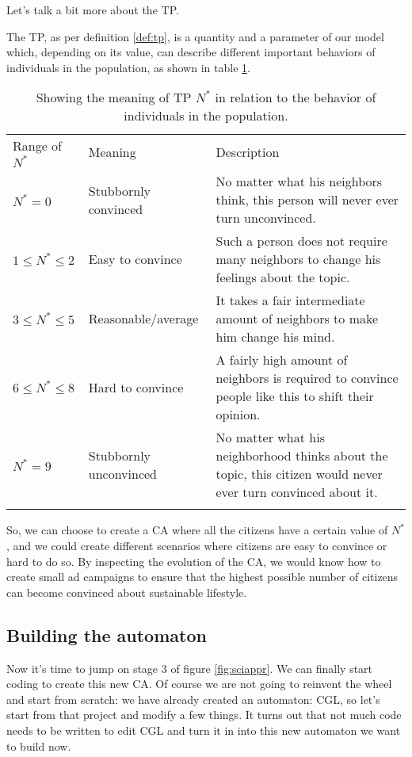 Let's talk a bit more about the TP.

\begin{proposition}
The TP, as per definition \ref{def:tp}, is a quantity and a parameter of our model which,
depending on its value, can describe different important behaviors of individuals in the population,
as shown in table \ref{tab:meaningn}.
\end{proposition}

%
%
\begin{table}[!t]
\centering
\caption{Showing the meaning of TP $N^\ast$ in relation to the behavior of individuals
in the population.}
\label{tab:meaningn}
%
%
\begin{tabular}{p{}p{}p{}}
\hline\noalign{\smallskip}
Range of $N^\ast$ & Meaning & Description \\
\noalign{\smallskip}\svhline\noalign{\smallskip}
$N^\ast = 0$ & Stubbornly convinced & No matter what his
neighbors think, this person will never ever turn unconvinced.\\
$1 \leq N^\ast \leq 2$ & Easy to convince  & Such a person does not
require many neighbors to change his feelings about the topic.\\
$3 \leq N^\ast \leq 5$ & Reasonable/average & It takes a fair
intermediate amount of neighbors to make him change his mind.\\
$6 \leq N^\ast \leq 8$ & Hard to convince & A fairly high amount of
neighbors is required to convince people like this to shift their opinion.\\
$N^\ast = 9$ & Stubbornly unconvinced & No matter what his
neighborhood thinks about the topic, this citizen would never ever turn convinced about it.\\
\noalign{\smallskip}\hline\noalign{\smallskip}
\end{tabular}
\end{table}
%

So, we can choose to create a CA where all the citizens have a certain value of $N^\ast$, and
we could create different scenarios where citizens are easy to convince or hard to do so.
By inspecting the evolution of the CA, we would know how to create small ad campaigns to ensure
that the highest possible number of citizens can become convinced about sustainable lifestyle.

\subsection{Building the automaton}
Now it's time to jump on stage 3 of figure \ref{fig:sciappr}. We can finally start coding to
create this new CA. Of course we are not going to reinvent the wheel and start from scratch: we
have already created an automaton: CGL, so let's start from that project and modify a few things.
It turns out that not much code needs to be written to edit CGL and turn it in into this new
automaton we want to build now.

